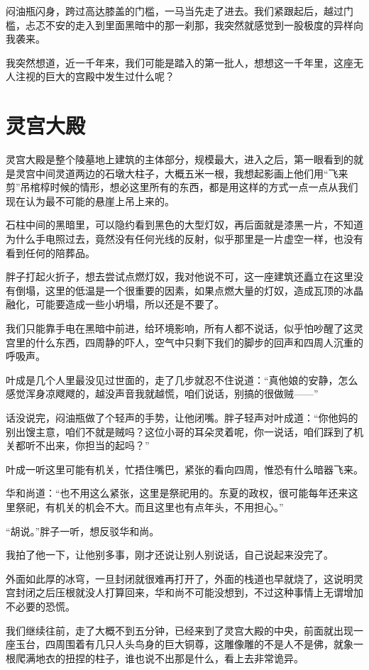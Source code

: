 闷油瓶闪身，跨过高达膝盖的门槛，一马当先走了进去。我们紧跟起后，越过门槛，忐忑不安的走入到里面黑暗中的那一刹那，我突然就感觉到一股极度的异样向我袭来。

我突然想道，近一千年来，我们可能是踏入的第一批人，想想这一千年里，这座无人注视的巨大的宫殿中发生过什么呢？

\chapter{灵宫大殿}

灵宫大殿是整个陵墓地上建筑的主体部分，规模最大，进入之后，第一眼看到的就是灵宫中间灵道两边的石墩大柱子，大概五米一根，我想起影画上他们用“飞来剪”吊棺椁时候的情形，想必这里所有的东西，都是用这样的方式一点一点从我们现在认为最不可能的悬崖上吊上来的。

石柱中间的黑暗里，可以隐约看到黑色的大型灯奴，再后面就是漆黑一片，不知道为什么手电照过去，竟然没有任何光线的反射，似乎那里是一片虚空一样，也没有看到任何的陪葬品。

胖子打起火折子，想去尝试点燃灯奴，我对他说不可，这一座建筑还矗立在这里没有倒塌，这里的低温是一个很重要的因素，如果点燃大量的灯奴，造成瓦顶的冰晶融化，可能要造成一些小坍塌，所以还是不要了。

我们只能靠手电在黑暗中前进，给环境影响，所有人都不说话，似乎怕吵醒了这灵宫里的什么东西，四周静的吓人，空气中只剩下我们的脚步的回声和四周人沉重的呼吸声。

叶成是几个人里最没见过世面的，走了几步就忍不住说道：“真他娘的安静，怎么感觉浑身凉飕飕的，越没声音我就越慌，咱们说话，别搞的很做贼——”

话没说完，闷油瓶做了个轻声的手势，让他闭嘴。胖子轻声对叶成道：“你他妈的别出馊主意，咱们不就是贼吗？这位小哥的耳朵灵着呢，你一说话，咱们踩到了机关都听不出来，你担当的起吗？”

叶成一听这里可能有机关，忙捂住嘴巴，紧张的看向四周，惟恐有什么暗器飞来。

华和尚道：“也不用这么紧张，这里是祭祀用的。东夏的政权，很可能每年还来这里祭祀，有机关的机会不大。而且这里也有点年头，不用担心。”

“胡说。”胖子一听，想反驳华和尚。

我拍了他一下，让他别多事，刚才还说让别人别说话，自己说起来没完了。

外面如此厚的冰穹，一旦封闭就很难再打开了，外面的栈道也早就烧了，这说明灵宫封闭之后压根就没人打算回来，华和尚不可能没想到，不过这种事情上无谓增加不必要的恐慌。

我们继续往前，走了大概不到五分钟，已经来到了灵宫大殿的中央，前面就出现一座玉台，四周围着有几只人头鸟身的巨大铜尊，这雕像雕的不是人不是佛，就象一根爬满地衣的扭捏的柱子，谁也说不出那是什么，看上去非常诡异。


